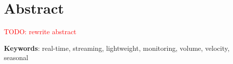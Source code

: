 \chapter*{Abstract}





\textcolor{red}{TODO: rewrite abstract}

\vspace*{10mm}\noindent
\textbf{Keywords}: real-time, streaming, lightweight, monitoring, volume, velocity, seasonal

